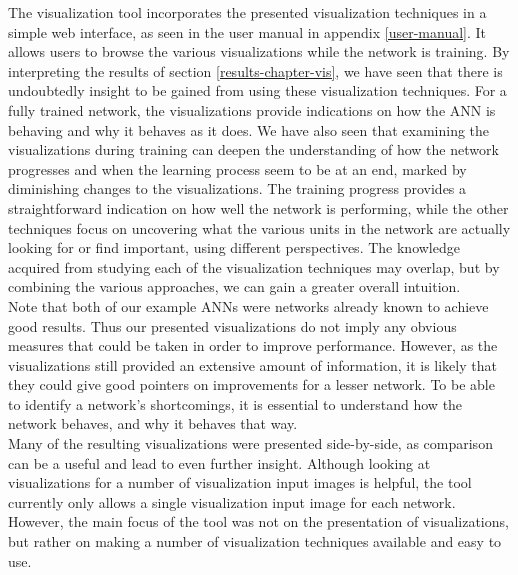 The visualization tool incorporates the presented visualization techniques in a simple web interface, as seen in the user manual in appendix \ref{user-manual}. It allows users to browse the various visualizations while the network is training. By interpreting the results of section \ref{results-chapter-vis}, we have seen that there is undoubtedly insight to be gained from using these visualization techniques. For a fully trained network, the visualizations provide indications on how the ANN is behaving and why it behaves as it does. We have also seen that examining the visualizations during training can deepen the understanding of how the network progresses and when the learning process seem to be at an end, marked by diminishing changes to the visualizations. The training progress provides a straightforward indication on how well the network is performing, while the other techniques focus on uncovering what the various units in the network are actually looking for or find important, using different perspectives. The knowledge acquired from studying each of the visualization techniques may overlap, but by combining the various approaches, we can gain a greater overall intuition. \\

\noindent Note that both of our example ANNs were networks already known to achieve good results. Thus our presented visualizations do not imply any obvious measures that could be taken in order to improve performance. However, as the visualizations still provided an extensive amount of information, it is likely that they could give good pointers on improvements for a lesser network. To be able to identify a network's shortcomings, it is essential to understand how the network behaves, and why it behaves that way. \\

\noindent Many of the resulting visualizations were presented side-by-side, as comparison can be a useful and lead to even further insight. Although looking at visualizations for a number of visualization input images is helpful, the tool currently only allows a single visualization input image for each network. However, the main focus of the tool was not on the presentation of visualizations, but rather on making a number of visualization techniques available and easy to use. \\


